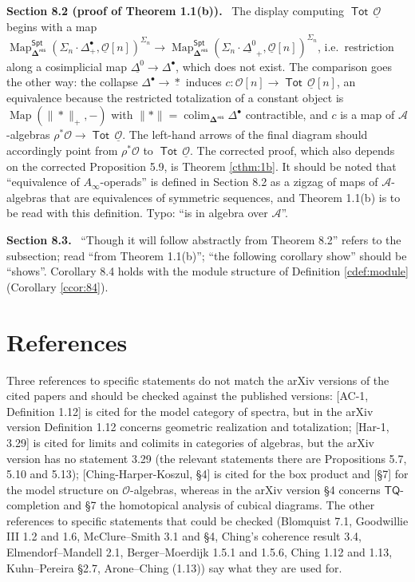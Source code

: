 \documentclass[12pt]{article}
\theoremstyle{plain}
\theoremstyle{definition}
\theoremstyle{remark}
\newcommand{\Cal}[1]{\mathcal{#1}}
\newcommand{\TQ}{\mathsf{TQ}}
\newcommand{\Tot}{\operatorname{\mathsf{Tot}}}
\newcommand{\bdel}{\mathbf{\Delta}}
\newcommand{\Dres}{\bdel^{\mathsf{res}}}
\newcommand{\pt}{*}
\newcommand{\Spt}{\mathsf{Spt}}
\newcommand{\Map}{\operatorname{Map}}
\newcommand{\corr}[1]{\par\smallskip\noindent\textbf{#1.}\ }
\begin{document}
\corr{Section 8.2 (proof of Theorem 1.1(b))} The display computing $\Tot\,\underline{\Cal O}$ begins with a map $\Map^{\Spt}_{\Dres}(\Sigma_n\cdot\Delta^\bullet_+,\underline{\Cal O}[n])^{\Sigma_n}\to\Map^{\Spt}_{\Dres}(\Sigma_n\cdot\underline{\Delta^0}_+,\underline{\Cal O}[n])^{\Sigma_n}$, i.e.\ restriction along a cosimplicial map $\underline{\Delta^0}\to\Delta^\bullet$, which does not exist. The comparison goes the other way: the collapse $\Delta^\bullet\to\underline\pt$ induces $c\colon\Cal O[n]\to\Tot\,\underline{\Cal O}[n]$, an equivalence because the restricted totalization of a constant object is $\Map(\|\pt\|_+,-)$ with $\|\pt\|=\operatorname{colim}_{\Dres}\Delta^\bullet$ contractible, and $c$ is a map of $\Cal A$-algebras $\rho^*\Cal O\to\Tot\,\underline{\Cal O}$. The left-hand arrows of the final diagram should accordingly point from $\rho^*\Cal O$ to $\Tot\,\underline{\Cal O}$. The corrected proof, which also depends on the corrected Proposition 5.9, is Theorem \ref{cthm:1b}. It should be noted that ``equivalence of $A_\infty$-operads'' is defined in Section 8.2 as a zigzag of maps of $\Cal A$-algebras that are equivalences of symmetric sequences, and Theorem 1.1(b) is to be read with this definition. Typo: ``is in algebra over $\Cal A$''.

\corr{Section 8.3} ``Though it will follow abstractly from Theorem 8.2'' refers to the subsection; read ``from Theorem 1.1(b)''; ``the following corollary show'' should be ``shows''. Corollary 8.4 holds with the module structure of Definition \ref{cdef:module} (Corollary \ref{ccor:84}).

\section*{References}
\label{sec:cites}

Three references to specific statements do not match the arXiv versions of the cited papers and should be checked against the published versions: [AC-1, Definition 1.12] is cited for the model category of spectra, but in the arXiv version Definition 1.12 concerns geometric realization and totalization; [Har-1, 3.29] is cited for limits and colimits in categories of algebras, but the arXiv version has no statement 3.29 (the relevant statements there are Propositions 5.7, 5.10 and 5.13); [Ching-Harper-Koszul, \S4] is cited for the box product and [\S7] for the model structure on $\Cal O$-algebras, whereas in the arXiv version \S4 concerns $\TQ$-completion and \S7 the homotopical analysis of cubical diagrams. The other references to specific statements that could be checked (Blomquist 7.1, Goodwillie III 1.2 and 1.6, McClure--Smith 3.1 and \S4, Ching's coherence result 3.4, Elmendorf--Mandell 2.1, Berger--Moerdijk 1.5.1 and 1.5.6, Ching 1.12 and 1.13, Kuhn--Pereira \S2.7, Arone--Ching (1.13)) say what they are used for.
\end{document}
